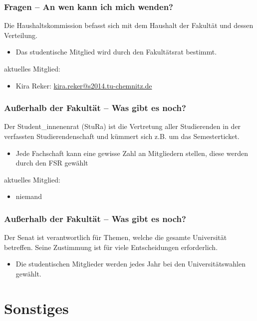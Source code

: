 \begin{frame}
\frametitle{Fragen -- An wen kann ich mich wenden?}
\begin{block}{\vphantom{X}}
	Die Haushaltskommission befasst sich mit dem Haushalt der Fakultät und dessen Verteilung.
\end{block}
\begin{itemize}
	\item Das studentische Mitglied wird durch den Fakultätsrat bestimmt.
\end{itemize}
aktuelles Mitglied:
\begin{itemize}
	\item Kira Reker: \href{mailto:kira.reker@s2014.tu-chemnitz.de}{kira.reker@s2014.tu-chemnitz.de}   
\end{itemize}
\end{frame}

\begin{frame}
\frametitle{Außerhalb der Fakultät -- Was gibt es noch?}
\begin{block}{\vphantom{X}}
	Der Student\_innenenrat (StuRa) ist die Vertretung aller Studierenden in der verfassten Studierendenschaft und kümmert sich z.B. um das Semesterticket.
\end{block}
\begin{itemize}
	\item Jede Fachschaft kann eine gewisse Zahl an Mitgliedern stellen, diese werden durch den FSR gewählt
\end{itemize}
aktuelles Mitglied:
\begin{itemize}
	\item niemand
\end{itemize}
\end{frame}

\begin{frame}
\frametitle{Außerhalb der Fakultät -- Was gibt es noch?}
\begin{block}{\vphantom{X}}
	Der Senat ist verantwortlich für Themen, welche die gesamte Universität betreffen. Seine Zustimmung ist für viele Entscheidungen erforderlich.
\end{block}
\begin{itemize}
	\item Die studentischen Mitglieder werden jedes Jahr bei den Universitätswahlen gewählt.
\end{itemize}
\end{frame}

\section{Sonstiges}

